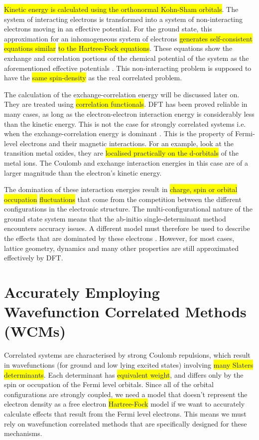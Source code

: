 \documentclass[10pt]{article}
\newcommand{\hilight}[1]{\colorbox{yellow}{#1}}
\begin{document}
\hilight{Kinetic energy is calculated using the orthonormal Kohn-Sham orbitals}. The system of interacting electrons is transformed into a system of non-interacting electrons moving in an effective potential. For the ground state, this approximation for an inhomogeneous system of electrons \hilight{generates self-consistent equations similar} \hilight{to the Hartree-Fock equations}. These equations show the exchange and correlation portions of the chemical potential of the system as the aforementioned effective potentials \cite{kohn1965self}. This non-interacting problem is supposed to have the \hilight{same spin-density} as the real correlated problem.

The calculation of the exchange-correlation energy will be discussed later on. They are treated using \hilight{correlation functionals}. DFT has been proved reliable in many cases, as long as the electron-electron interaction energy is considerably less than the kinetic energy. This is not the case for strongly correlated systems i.e. when the exchange-correlation energy is dominant \cite{pickett1989electronic}. This is the property of Fermi-level electrons and their magnetic interactions. For an example, look at the transition metal oxides, they are \hilight{localised practically on the d-orbitals} of the metal ions. The Coulomb and exchange interaction energies in this case are of a larger magnitude than the electron's kinetic energy.

The domination of these interaction energies result in \hilight{charge, spin or orbital occupation} \hilight{fluctuations} that come from the competition between the different configurations in the electronic structure. The multi-configurational nature of the ground state system means that the ab-initio single-determinant method encounters accuracy issues. A different model must therefore be used to describe the effects that are dominated by these electrons \cite{gelle2009accurate}. However, for most cases, lattice geometry, dynamics and many other properties are still approximated effectively by DFT.

\section{Accurately Employing Wavefunction Correlated Methods (WCMs)}

Correlated systems are characterised by strong Coulomb repulsions, which result in wavefunctions (for ground and low lying excited states) involving \hilight{many Slaters determinants}. Each determinant has \hilight{equivalent weight}, and differs only by the spin or occupation of the Fermi level orbitals. Since all of the orbital configurations are strongly coupled, we need a model that doesn't represent the electron density as a free electron \hilight{Hartree-Fock} model if we want to accurately calculate effects that result from the Fermi level electrons. This means we must rely on wavefunction correlated methods that are specifically designed for these mechanisms. 
\end{document}
